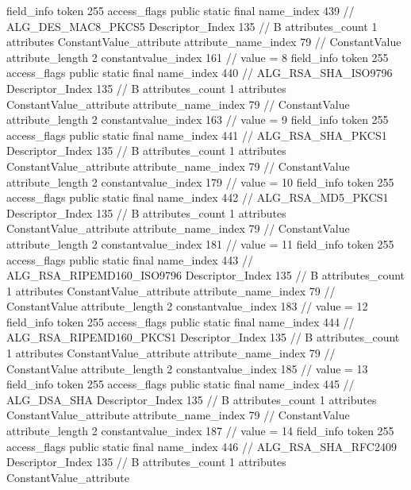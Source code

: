 {{{{{{{				}
				}
			}
			field_info {
				token	255
				access_flags	public static final
				name_index	439		// ALG_DES_MAC8_PKCS5
				Descriptor_Index	135		// B
				attributes_count	1
				attributes {
				ConstantValue_attribute {
					attribute_name_index	79		// ConstantValue
					attribute_length	2
					constantvalue_index	161		// value = 8
				}
				}
			}
			field_info {
				token	255
				access_flags	public static final
				name_index	440		// ALG_RSA_SHA_ISO9796
				Descriptor_Index	135		// B
				attributes_count	1
				attributes {
				ConstantValue_attribute {
					attribute_name_index	79		// ConstantValue
					attribute_length	2
					constantvalue_index	163		// value = 9
				}
				}
			}
			field_info {
				token	255
				access_flags	public static final
				name_index	441		// ALG_RSA_SHA_PKCS1
				Descriptor_Index	135		// B
				attributes_count	1
				attributes {
				ConstantValue_attribute {
					attribute_name_index	79		// ConstantValue
					attribute_length	2
					constantvalue_index	179		// value = 10
				}
				}
			}
			field_info {
				token	255
				access_flags	public static final
				name_index	442		// ALG_RSA_MD5_PKCS1
				Descriptor_Index	135		// B
				attributes_count	1
				attributes {
				ConstantValue_attribute {
					attribute_name_index	79		// ConstantValue
					attribute_length	2
					constantvalue_index	181		// value = 11
				}
				}
			}
			field_info {
				token	255
				access_flags	public static final
				name_index	443		// ALG_RSA_RIPEMD160_ISO9796
				Descriptor_Index	135		// B
				attributes_count	1
				attributes {
				ConstantValue_attribute {
					attribute_name_index	79		// ConstantValue
					attribute_length	2
					constantvalue_index	183		// value = 12
				}
				}
			}
			field_info {
				token	255
				access_flags	public static final
				name_index	444		// ALG_RSA_RIPEMD160_PKCS1
				Descriptor_Index	135		// B
				attributes_count	1
				attributes {
				ConstantValue_attribute {
					attribute_name_index	79		// ConstantValue
					attribute_length	2
					constantvalue_index	185		// value = 13
				}
				}
			}
			field_info {
				token	255
				access_flags	public static final
				name_index	445		// ALG_DSA_SHA
				Descriptor_Index	135		// B
				attributes_count	1
				attributes {
				ConstantValue_attribute {
					attribute_name_index	79		// ConstantValue
					attribute_length	2
					constantvalue_index	187		// value = 14
				}
				}
			}
			field_info {
				token	255
				access_flags	public static final
				name_index	446		// ALG_RSA_SHA_RFC2409
				Descriptor_Index	135		// B
				attributes_count	1
				attributes {
				ConstantValue_attribute {
}}}}}}}
